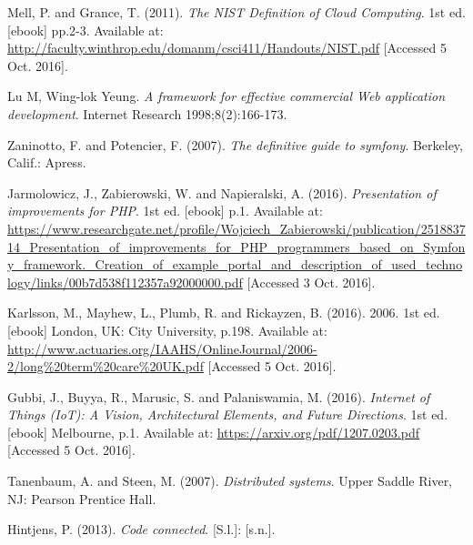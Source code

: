 \begin{thebibliography}{1}

Mell, P. and Grance, T. (2011). \emph{The NIST Definition of Cloud Computing}. 1st ed. [ebook] pp.2-3. Available at: \url{http://faculty.winthrop.edu/domanm/csci411/Handouts/NIST.pdf} [Accessed 5 Oct. 2016].

Lu M, Wing-lok Yeung. \emph{A framework for effective commercial Web application development}. Internet Research 1998;8(2):166-173.

Zaninotto, F. and Potencier, F. (2007). \emph{The definitive guide to symfony}. Berkeley, Calif.: Apress.

Jarmolowicz, J., Zabierowski, W. and Napieralski, A. (2016). \emph{Presentation of improvements for PHP}. 1st ed. [ebook] p.1. Available at: \url{https://www.researchgate.net/profile/Wojciech_Zabierowski/publication/251883714_Presentation_of_improvements_for_PHP_programmers_based_on_Symfony_framework._Creation_of_example_portal_and_description_of_used_technology/links/00b7d538f112357a92000000.pdf} [Accessed 3 Oct. 2016].

Karlsson, M., Mayhew, L., Plumb, R. and Rickayzen, B. (2016). 2006. 1st ed. [ebook] London, UK: City University, p.198. Available at: \url{http://www.actuaries.org/IAAHS/OnlineJournal/2006-2/long\%20term\%20care\%20UK.pdf} [Accessed 5 Oct. 2016].

Gubbi, J., Buyya, R., Marusic, S. and Palaniswamia, M. (2016). \emph{Internet of Things (IoT): A Vision, Architectural Elements, and Future Directions}. 1st ed. [ebook] Melbourne, p.1. Available at: \url{https://arxiv.org/pdf/1207.0203.pdf} [Accessed 5 Oct. 2016].

Tanenbaum, A. and Steen, M. (2007). \emph{Distributed systems}. Upper Saddle River, NJ: Pearson Prentice Hall.

Hintjens, P. (2013). \emph{Code connected}. [S.l.]: [s.n.].


\end{thebibliography}